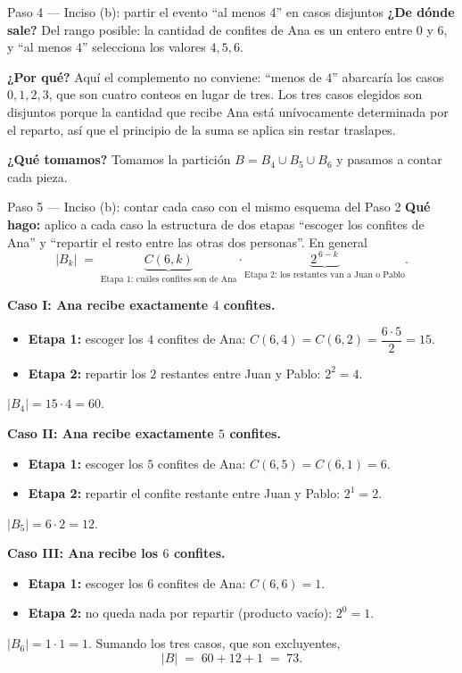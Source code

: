 \documentclass[11pt]{article}
\begin{document}
\begin{sol}
\begin{paso}{Paso 4 --- Inciso (b): partir el evento ``al menos 4'' en casos disjuntos}
\textbf{¿De d\'onde sale?} Del rango posible: la cantidad de confites de Ana es un entero entre $0$ y $6$, y ``al menos $4$'' selecciona los valores $4,5,6$.

\textbf{¿Por qu\'e?} Aqu\'i el complemento no conviene: ``menos de $4$'' abarcar\'ia los casos $0,1,2,3$, que son cuatro conteos en lugar de tres. Los tres casos elegidos son disjuntos porque la cantidad que recibe Ana est\'a un\'ivocamente determinada por el reparto, as\'i que el principio de la suma se aplica sin restar traslapes.

\textbf{¿Qu\'e tomamos?} Tomamos la partici\'on $B=B_4\cup B_5\cup B_6$ y pasamos a contar cada pieza.
\end{paso}

\begin{paso}{Paso 5 --- Inciso (b): contar cada caso con el mismo esquema del Paso 2}
\textbf{Qu\'e hago:} aplico a cada caso la estructura de dos etapas ``escoger los confites de Ana'' y ``repartir el resto entre las otras dos personas''. En general
\[
|B_k| \;=\; \underbrace{C(6,k)}_{\text{Etapa 1: cu\'ales confites son de Ana}}\cdot\underbrace{2^{\,6-k}}_{\text{Etapa 2: los restantes van a Juan o Pablo}} .
\]

\medskip
\textbf{Caso I: Ana recibe exactamente $4$ confites.}
\begin{itemize}[leftmargin=*]
  \item \textbf{Etapa 1:} escoger los $4$ confites de Ana: $C(6,4)=C(6,2)=\dfrac{6\cdot 5}{2}=15$.
  \item \textbf{Etapa 2:} repartir los $2$ restantes entre Juan y Pablo: $2^{2}=4$.
\end{itemize}
$|B_4|=15\cdot 4=60$.

\medskip
\textbf{Caso II: Ana recibe exactamente $5$ confites.}
\begin{itemize}[leftmargin=*]
  \item \textbf{Etapa 1:} escoger los $5$ confites de Ana: $C(6,5)=C(6,1)=6$.
  \item \textbf{Etapa 2:} repartir el confite restante entre Juan y Pablo: $2^{1}=2$.
\end{itemize}
$|B_5|=6\cdot 2=12$.

\medskip
\textbf{Caso III: Ana recibe los $6$ confites.}
\begin{itemize}[leftmargin=*]
  \item \textbf{Etapa 1:} escoger los $6$ confites de Ana: $C(6,6)=1$.
  \item \textbf{Etapa 2:} no queda nada por repartir (producto vac\'io): $2^{0}=1$.
\end{itemize}
$|B_6|=1\cdot 1=1$. Sumando los tres casos, que son excluyentes,
\[
|B| \;=\; 60+12+1 \;=\; 73 .
\]


\end{paso}
\end{sol}
\end{document}
